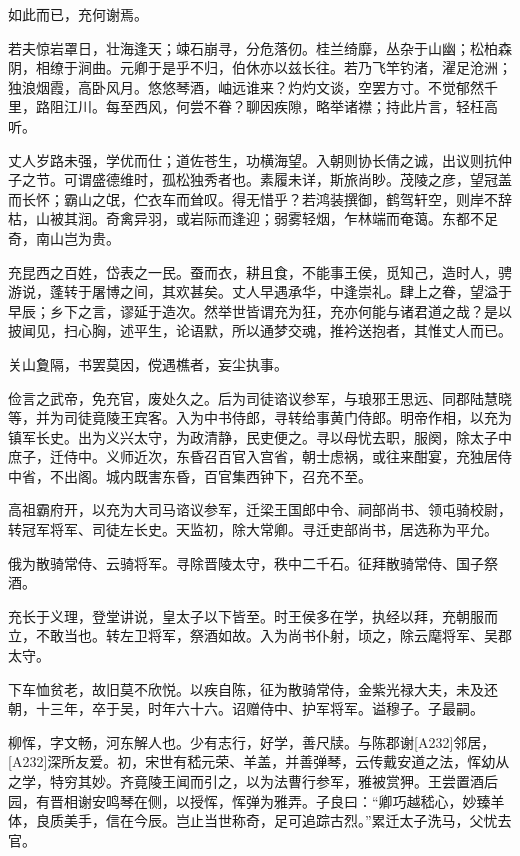 \documentclass[12pt,UTF8]{ctexbook}
\begin{document}
如此而已，充何谢焉。

若夫惊岩罩日，壮海逢天；竦石崩寻，分危落仞。桂兰绮靡，丛杂于山幽；松柏森阴，相缭于涧曲。元卿于是乎不归，伯休亦以兹长往。若乃飞竿钓渚，濯足沧洲；独浪烟霞，高卧风月。悠悠琴酒，岫远谁来？灼灼文谈，空罢方寸。不觉郁然千里，路阻江川。每至西风，何尝不眷？聊因疾隙，略举诸襟；持此片言，轻枉高听。

丈人岁路未强，学优而仕；道佐苍生，功横海望。入朝则协长倩之诚，出议则抗仲子之节。可谓盛德维时，孤松独秀者也。素履未详，斯旅尚眇。茂陵之彦，望冠盖而长怀；霸山之氓，伫衣车而耸叹。得无惜乎？若鸿装撰御，鹤驾轩空，则岸不辞枯，山被其润。奇禽异羽，或岩际而逢迎；弱雾轻烟，乍林端而奄蔼。东都不足奇，南山岂为贵。

充昆西之百姓，岱表之一民。蚕而衣，耕且食，不能事王侯，觅知己，造时人，骋游说，蓬转于屠博之间，其欢甚矣。丈人早遇承华，中逢崇礼。肆上之眷，望溢于早辰；乡下之言，谬延于造次。然举世皆谓充为狂，充亦何能与诸君道之哉？是以披闻见，扫心胸，述平生，论语默，所以通梦交魂，推衿送抱者，其惟丈人而已。

关山夐隔，书罢莫因，傥遇樵者，妄尘执事。

俭言之武帝，免充官，废处久之。后为司徒谘议参军，与琅邪王思远、同郡陆慧晓等，并为司徒竟陵王宾客。入为中书侍郎，寻转给事黄门侍郎。明帝作相，以充为镇军长史。出为义兴太守，为政清静，民吏便之。寻以母忧去职，服阕，除太子中庶子，迁侍中。义师近次，东昏召百官入宫省，朝士虑祸，或往来酣宴，充独居侍中省，不出阁。城内既害东昏，百官集西钟下，召充不至。

高祖霸府开，以充为大司马谘议参军，迁梁王国郎中令、祠部尚书、领屯骑校尉，转冠军将军、司徒左长史。天监初，除大常卿。寻迁吏部尚书，居选称为平允。

俄为散骑常侍、云骑将军。寻除晋陵太守，秩中二千石。征拜散骑常侍、国子祭酒。

充长于义理，登堂讲说，皇太子以下皆至。时王侯多在学，执经以拜，充朝服而立，不敢当也。转左卫将军，祭酒如故。入为尚书仆射，顷之，除云麾将军、吴郡太守。

下车恤贫老，故旧莫不欣悦。以疾自陈，征为散骑常侍，金紫光禄大夫，未及还朝，十三年，卒于吴，时年六十六。诏赠侍中、护军将军。谥穆子。子最嗣。

柳恽，字文畅，河东解人也。少有志行，好学，善尺牍。与陈郡谢[A232]邻居，[A232]深所友爱。初，宋世有嵇元荣、羊盖，并善弹琴，云传戴安道之法，恽幼从之学，特穷其妙。齐竟陵王闻而引之，以为法曹行参军，雅被赏狎。王尝置酒后园，有晋相谢安鸣琴在侧，以授恽，恽弹为雅弄。子良曰：“卿巧越嵇心，妙臻羊体，良质美手，信在今辰。岂止当世称奇，足可追踪古烈。”累迁太子洗马，父忧去官。
\end{document}
